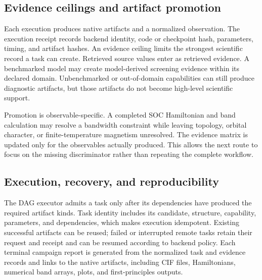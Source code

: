 \subsection{Evidence ceilings and artifact promotion}

Each execution produces native artifacts and a normalized observation.  The execution receipt records backend identity, code or checkpoint hash, parameters, timing, and artifact hashes.  An evidence ceiling limits the strongest scientific record a task can create.  Retrieved source values enter as retrieved evidence.  A benchmarked model may create model-derived screening evidence within its declared domain.  Unbenchmarked or out-of-domain capabilities can still produce diagnostic artifacts, but those artifacts do not become high-level scientific support.

Promotion is observable-specific.  A completed SOC Hamiltonian and band calculation may resolve a bandwidth constraint while leaving topology, orbital character, or finite-temperature magnetism unresolved.  The evidence matrix is updated only for the observables actually produced.  This allows the next route to focus on the missing discriminator rather than repeating the complete workflow.

\subsection{Execution, recovery, and reproducibility}

The DAG executor admits a task only after its dependencies have produced the required artifact kinds.  Task identity includes its candidate, structure, capability, parameters, and dependencies, which makes execution idempotent.  Existing successful artifacts can be reused; failed or interrupted remote tasks retain their request and receipt and can be resumed according to backend policy.  Each terminal campaign report is generated from the normalized task and evidence records and links to the native artifacts, including CIF files, Hamiltonians, numerical band arrays, plots, and first-principles outputs.
